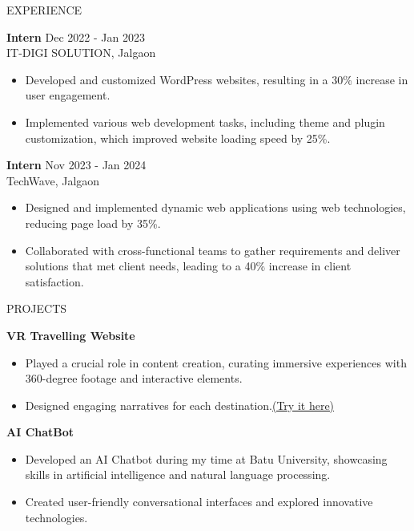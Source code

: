 \documentclass{resume} %
\begin{document}
\begin{rSection}{EXPERIENCE}

\textbf{Intern} \hfill Dec 2022 - Jan 2023 \\
IT-DIGI SOLUTION, Jalgaon
\begin{itemize}
    \item Developed and customized WordPress websites, resulting in a 30\% increase in user engagement.
    \item Implemented various web development tasks, including theme and plugin customization, which improved website loading speed by 25\%. 
\end{itemize}

\textbf{Intern} \hfill Nov 2023 - Jan 2024 \\
TechWave, Jalgaon
\begin{itemize}
    \item Designed and implemented dynamic web applications using web technologies, reducing page load by 35\%.
    \item Collaborated with cross-functional teams to gather requirements and deliver solutions that met client needs, leading to a 40\% increase in client satisfaction.
\end{itemize}

\end{rSection}


\begin{rSection}{PROJECTS}

\textbf{VR Travelling Website}
\begin{itemize}
    \item Played a crucial role in content creation, curating immersive experiences with 360-degree footage and interactive elements.
    \item Designed engaging narratives for each destination.\href{https://vr-travelling-website.vercel.app/}{(Try it here)}
\end{itemize}

\textbf{AI ChatBot}
\begin{itemize}
    \item Developed an AI Chatbot during my time at Batu University, showcasing skills in artificial intelligence and natural language processing.
    \item Created user-friendly conversational interfaces and explored innovative technologies.
\end{itemize}

\end{rSection}
\end{document}
